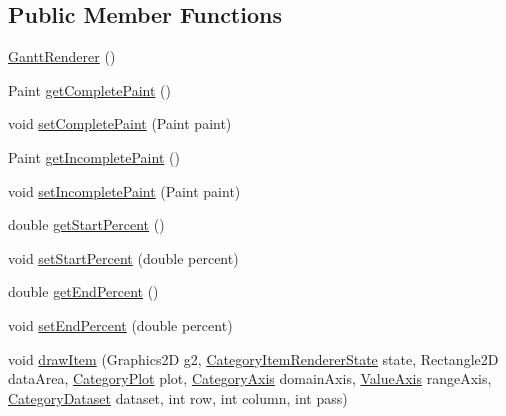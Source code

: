 \subsection*{Public Member Functions}
\begin{DoxyCompactItemize}
\item 
\mbox{\hyperlink{classorg_1_1jfree_1_1chart_1_1renderer_1_1category_1_1_gantt_renderer_a324f497c39a28d2a1130e93a988eea14}{Gantt\+Renderer}} ()
\item 
Paint \mbox{\hyperlink{classorg_1_1jfree_1_1chart_1_1renderer_1_1category_1_1_gantt_renderer_ac6ee4267ce1266e2f84a574ac70991b5}{get\+Complete\+Paint}} ()
\item 
void \mbox{\hyperlink{classorg_1_1jfree_1_1chart_1_1renderer_1_1category_1_1_gantt_renderer_a1c8e067f9e946aae2f936646c0334bd7}{set\+Complete\+Paint}} (Paint paint)
\item 
Paint \mbox{\hyperlink{classorg_1_1jfree_1_1chart_1_1renderer_1_1category_1_1_gantt_renderer_a2b26bad11e194ccbe68243b368d87240}{get\+Incomplete\+Paint}} ()
\item 
void \mbox{\hyperlink{classorg_1_1jfree_1_1chart_1_1renderer_1_1category_1_1_gantt_renderer_a6ceb4fd7bbed12681cbb3da2d1d9c57c}{set\+Incomplete\+Paint}} (Paint paint)
\item 
double \mbox{\hyperlink{classorg_1_1jfree_1_1chart_1_1renderer_1_1category_1_1_gantt_renderer_a3c72daf1588ba204a38f49a01cd387f3}{get\+Start\+Percent}} ()
\item 
void \mbox{\hyperlink{classorg_1_1jfree_1_1chart_1_1renderer_1_1category_1_1_gantt_renderer_a3541315737abffd6295be998a0c4d2b6}{set\+Start\+Percent}} (double percent)
\item 
double \mbox{\hyperlink{classorg_1_1jfree_1_1chart_1_1renderer_1_1category_1_1_gantt_renderer_a4675717c2d315a0b9281d5de28f2a1dd}{get\+End\+Percent}} ()
\item 
void \mbox{\hyperlink{classorg_1_1jfree_1_1chart_1_1renderer_1_1category_1_1_gantt_renderer_a586fd9271c75caaebfb115052ba70fd4}{set\+End\+Percent}} (double percent)
\item 
void \mbox{\hyperlink{classorg_1_1jfree_1_1chart_1_1renderer_1_1category_1_1_gantt_renderer_a1bdd1d05e29085455cf60c38779f9bae}{draw\+Item}} (Graphics2D g2, \mbox{\hyperlink{classorg_1_1jfree_1_1chart_1_1renderer_1_1category_1_1_category_item_renderer_state}{Category\+Item\+Renderer\+State}} state, Rectangle2D data\+Area, \mbox{\hyperlink{classorg_1_1jfree_1_1chart_1_1plot_1_1_category_plot}{Category\+Plot}} plot, \mbox{\hyperlink{classorg_1_1jfree_1_1chart_1_1axis_1_1_category_axis}{Category\+Axis}} domain\+Axis, \mbox{\hyperlink{classorg_1_1jfree_1_1chart_1_1axis_1_1_value_axis}{Value\+Axis}} range\+Axis, \mbox{\hyperlink{interfaceorg_1_1jfree_1_1data_1_1category_1_1_category_dataset}{Category\+Dataset}} dataset, int row, int column, int pass)

\end{DoxyCompactItemize}
